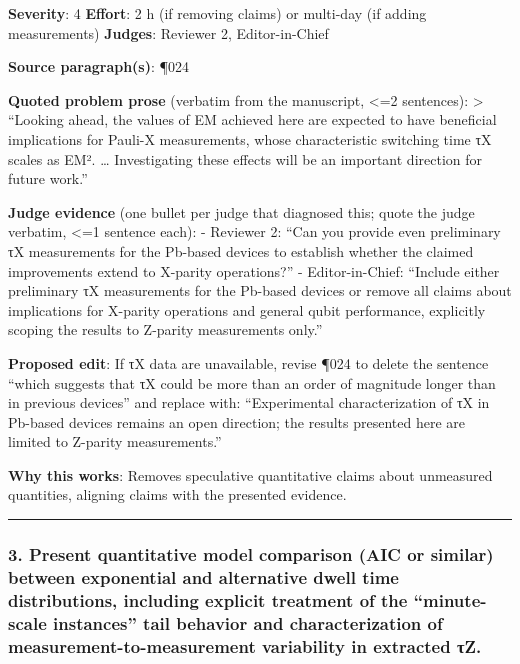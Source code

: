 \documentclass[10pt,letterpaper]{article}
\begin{document}
\textbf{Severity}: 4 \textbf{Effort}: 2 h (if removing claims) or multi-day (if adding measurements) \textbf{Judges}: Reviewer 2, Editor-in-Chief

\textbf{Source paragraph(s)}: ¶024

\textbf{Quoted problem prose} (verbatim from the manuscript, \textless=2 sentences):
\textgreater{} ``Looking ahead, the values of EM achieved here are expected to have beneficial implications for Pauli-X measurements, whose characteristic switching time τX scales as EM². \ldots{} Investigating these effects will be an important direction for future work.''

\textbf{Judge evidence} (one bullet per judge that diagnosed this; quote the judge verbatim, \textless=1 sentence each):
- Reviewer 2: ``Can you provide even preliminary τX measurements for the Pb-based devices to establish whether the claimed improvements extend to X-parity operations?''
- Editor-in-Chief: ``Include either preliminary τX measurements for the Pb-based devices or remove all claims about implications for X-parity operations and general qubit performance, explicitly scoping the results to Z-parity measurements only.''

\textbf{Proposed edit}: If τX data are unavailable, revise ¶024 to delete the sentence ``which suggests that τX could be more than an order of magnitude longer than in previous devices'' and replace with: ``Experimental characterization of τX in Pb-based devices remains an open direction; the results presented here are limited to Z-parity measurements.''

\textbf{Why this works}: Removes speculative quantitative claims about unmeasured quantities, aligning claims with the presented evidence.

\begin{center}\rule{0.5\linewidth}{0.5pt}\end{center}

\hypertarget{present-quantitative-model-comparison-aic-or-similar-between-exponential-and-alternative-dwell-time-distributions-including-explicit-treatment-of-the-minute-scale-instances-tail-behavior-and-characterization-of-measurement-to-measurement-variability-in-extracted-ux3c4z.}{%
\subsubsection{3. Present quantitative model comparison (AIC or similar) between exponential and alternative dwell time distributions, including explicit treatment of the ``minute-scale instances'' tail behavior and characterization of measurement-to-measurement variability in extracted τZ.}\label{present-quantitative-model-comparison-aic-or-similar-between-exponential-and-alternative-dwell-time-distributions-including-explicit-treatment-of-the-minute-scale-instances-tail-behavior-and-characterization-of-measurement-to-measurement-variability-in-extracted-ux3c4z.}}
\end{document}
